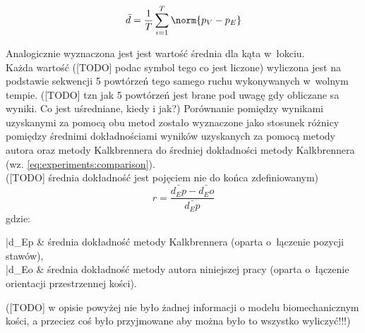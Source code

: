 \begin{equation}
	\bar{d} = \frac{1}{T}\sum_{i=1}^{T}{\norm{p_V - p_E}}
	\label{eq:experiments:euclidean}
\end{equation}

Analogicznie wyznaczona jest jest wartość średnia dla kąta w~łokciu.\\
Każda wartość ([TODO] podac symbol tego co jest liczone) wyliczona jest na podstawie sekwencji 5 powtórzeń tego samego ruchu wykonywanych w~wolnym tempie. ([TODO] tzn jak 5 powtórzeń jest brane pod uwagę gdy obliczane sa wyniki. Co jest uśredniane, kiedy i jak?)
Porównanie pomiędzy wynikami uzyskanymi za pomocą obu metod zostało wyznaczone jako stosunek różnicy pomiędzy średnimi dokładnościami wyników uzyskanych za pomocą metody autora oraz metody Kalkbrennera do średniej dokładności metody Kalkbrennera (wz. \eqref{eq:experiments:comparison}).\\
([TODO] średnia dokładność jest pojęciem nie do końca zdefiniowanym)
\begin{equation}
	r = \frac{\bar{d_Ep} - \bar{d_Eo}}{\bar{d_Ep}}
	\label{eq:experiments:comparison}
\end{equation}
gdzie:
\begin{conditions}
	\bar{d_Ep} & średnia dokładność metody Kalkbrennera (oparta o~łączenie pozycji stawów),\\	
	\bar{d_Eo} & średnia dokładność metody autora niniejszej pracy (oparta o~łączenie orientacji przestrzennej kości).\\
\end{conditions}

([TODO] w opisie powyżej nie było żadnej informacji o modelu biomechanicznym kości, a przeciez coś było przyjmowane aby można było to wszystko wyliczyć!!!)
